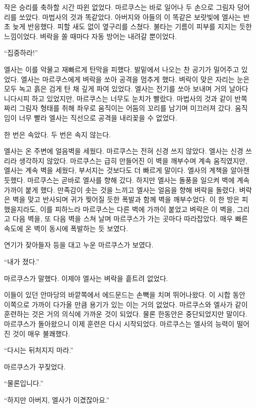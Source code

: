 작은 승리를 축하할 시간 따윈 없었다. 마르쿠스는 바로 일어나 두 손으로 그림자 덩어리를 쏘았다. 마법사의 것과 똑같았다. 아버지와 아들의 이 똑같은 보랏빛에 엘사는 반 초 늦게 반응했다. 피할 새도 없이 옆구리를 스쳤다. 불타는 기름이 피부를 지지는 듯한 느낌이었다. 벼락을 쏠 때마다 자동 방어는 내려갈 뿐이었다.

``집중하라!''

엘사는 이를 악물고 재빠르게 탄막을 피했다. 발밑에서 나오는 찬 공기가 밀어주고 있었다. 엘사는 마르쿠스에게 벼락을 쏘아 공격을 멈추게 했다. 벼락이 맞은 자리는 눈은 모두 녹고 흙은 검게 탄 채 깊게 파여 있었다. 엘사는 전기를 쏘아 보내며 거의 날아다니다시피 하고 있었지만, 마르쿠스는 너무도 눈치가 빨랐다. 마법사의 것과 같이 반쪽짜리 그림자 형태를 취해 좌우로 움직이는 어둠의 꼬리를 남기며 미끄러져 갔다. 움직임이 너무 빨라 엘사는 직선으로 공격을 내리꽂을 수 없었다.

한 번은 속았다. 두 번은 속지 않는다.

엘사는 온 주변에 얼음벽을 세웠다. 마르쿠스는 전혀 신경 쓰지 않았다. 엘사는 신경 쓰리라 생각하지 않았다. 마르쿠스는 급히 만들어진 이 벽을 깨부수며 계속 움직였지만, 엘사는 계속 벽을 세웠다, 부서지는 것보다도 더 빠르게 말이다. 엘사의 계책을 알아챈 듯했다. 마르쿠스는 곧바로 엘사를 향해 갔다. 하지만 엘사는 돌풍을 일으켜 벽에 계속 가까이 붙게 했다. 만족감이 솟는 것을 느끼고 엘사는 얼음을 향해 벼락을 돌렸다. 벼락은 벽을 맞고 반사되며 귀가 찢어질 듯한 폭발과 함께 벽을 깨부수었다. 이 한 방은 피했을지라도, 이를 피하느라 마르쿠스는 다른 벽에 가까이 붙었고 벼락은 이 벽을, 그리고 다음 벽을, 또 다음 벽을 스쳐 날며 마르쿠스가 가는 곳마다 따라잡았다. 매우 빠른 속도에 온 벽이 동시에 폭발하는 듯 보였다.

연기가 잦아들자 등을 대고 누운 마르쿠스가 보였다.

``내가 졌다.''

마르쿠스가 말했다. 이제야 엘사는 벼락을 흩트려 없었다.

이들이 있던 안마당의 바깥쪽에서 에드문드는 손뼉을 치며 뛰어나왔다. 이 시합 동안 이쪽으로 가까이 다가올 만큼 용기가 있는 이는 거의 없었다. 마르쿠스와 엘사가 같이 훈련하는 것은 거의 의식에 가까운 것이 되었다. 물론 한동안은 중단되었지만 말이다. 마르쿠스가 돌아왔으니 이제 훈련은 다시 시작되었다. 마르쿠스는 엘사의 능력이 떨어진 것이 매우 불쾌했다.

``다시는 뒤처지지 마라.''

마르쿠스가 꾸짖었다.

``물론입니다.''

``하지만 아버지, 엘사가 이겼잖아요.''

